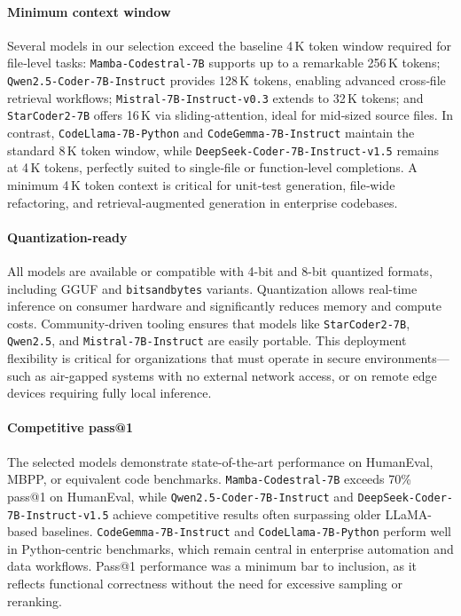 \paragraph{Minimum context window}
Several models in our selection exceed the baseline 4\,K token window required for file‐level tasks: \texttt{Mamba-Codestral-7B} supports up to a remarkable 256\,K tokens; \texttt{Qwen2.5-Coder-7B-Instruct} provides 128\,K tokens, enabling advanced cross‐file retrieval workflows; \texttt{Mistral-7B-Instruct-v0.3} extends to 32\,K tokens; and \texttt{StarCoder2-7B} offers 16\,K via sliding‐attention, ideal for mid‐sized source files. In contrast, \texttt{CodeLlama-7B-Python} and \texttt{CodeGemma-7B-Instruct} maintain the standard 8\,K token window, while \texttt{DeepSeek-Coder-7B-Instruct-v1.5} remains at 4\,K tokens, perfectly suited to single‐file or function‐level completions. A minimum 4\,K token context is critical for unit‐test generation, file‐wide refactoring, and retrieval‐augmented generation in enterprise codebases.

\paragraph{Quantization-ready}
All models are available or compatible with 4-bit and 8-bit quantized formats, including GGUF and \texttt{bitsandbytes} variants. Quantization allows real-time inference on consumer hardware and significantly reduces memory and compute costs. Community-driven tooling ensures that models like \texttt{StarCoder2-7B}, \texttt{Qwen2.5}, and \texttt{Mistral-7B-Instruct} are easily portable. This deployment flexibility is critical for organizations that must operate in secure environments---such as air-gapped systems with no external network access, or on remote edge devices requiring fully local inference.

\paragraph{Competitive pass@1}
The selected models demonstrate state-of-the-art performance on HumanEval, MBPP, or equivalent code benchmarks. \texttt{Mamba-Codestral-7B} exceeds 70\% pass@1 on HumanEval, while \texttt{Qwen2.5-Coder-7B-Instruct} and \texttt{DeepSeek-Coder-7B-Instruct-v1.5} achieve competitive results often surpassing older LLaMA-based baselines. \texttt{CodeGemma-7B-Instruct} and \texttt{CodeLlama-7B-Python} perform well in Python-centric benchmarks, which remain central in enterprise automation and data workflows. Pass@1 performance was a minimum bar to inclusion, as it reflects functional correctness without the need for excessive sampling or reranking.

